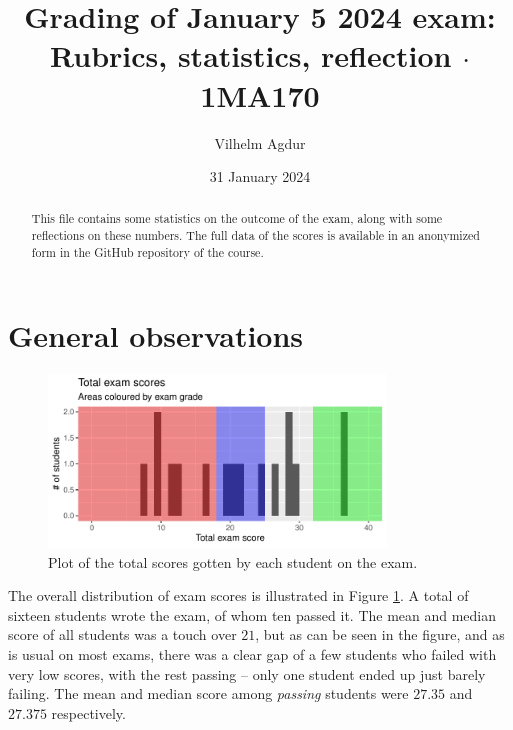 \documentclass[nobib]{tufte-handout}
\title{Grading of January 5 2024 exam: Rubrics, statistics, reflection $\cdot$ 1MA170}
\author[Vilhelm Agdur]{Vilhelm Agdur}
\date{31 January 2024}
\begin{document}
\maketitle%

\begin{abstract}
\noindent
This file contains some statistics on the outcome of the exam, along with some reflections on these numbers. The full data of the scores is available in an anonymized form in the GitHub repository of the course.
\end{abstract}

\section{General observations}

\begin{figure}
  \centering
  \includegraphics[width = 0.8\textwidth]{totalscore.pdf}
  \caption[Total score figure]{Plot of the total scores gotten by each student on the exam.}
  \label{fig:total_scores}
\end{figure}

The overall distribution of exam scores is illustrated in Figure \ref{fig:total_scores}. A total of sixteen students wrote the exam, of whom ten passed it. The mean and median score of all students was a touch over $21$, but as can be seen in the figure, and as is usual on most exams, there was a clear gap of a few students who failed with very low scores, with the rest passing -- only one student ended up just barely failing. The mean and median score among \emph{passing} students were $27.35$ and $27.375$ respectively.
\end{document}
